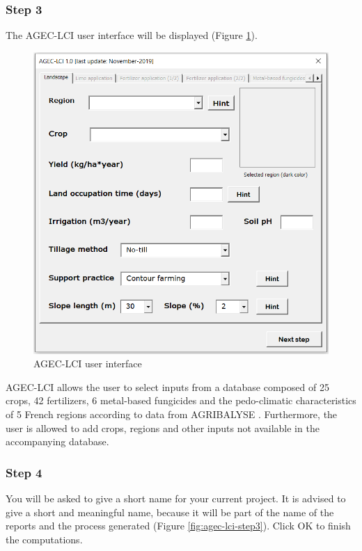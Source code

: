 \documentclass[openany]{book}
\begin{document}
\hypertarget{step-3}{%
\subsubsection*{Step 3}\label{step-3}}

The AGEC-LCI user interface will be displayed (Figure \ref{fig:agec-lci-step2}).

\begin{figure}[ht]

{\centering \includegraphics[width=0.65\linewidth]{Figures/agec_lci_step2} 

}

\caption{AGEC-LCI user interface}\label{fig:agec-lci-step2}
\end{figure}

AGEC-LCI allows the user to select inputs from a database composed of 25 crops, 42 fertilizers, 6 metal-based fungicides and the pedo-climatic characteristics of 5 French regions according to data from AGRIBALYSE \citep{Koch2015}. Furthermore, the user is allowed to add crops, regions and other inputs not available in the accompanying database.

\hypertarget{step-4}{%
\subsubsection*{Step 4}\label{step-4}}

You will be asked to give a short name for your current project. It is advised to give a short and meaningful name, because it will be part of the name of the reports and the process generated (Figure \ref{fig:agec-lci-step3}). Click OK to finish the computations.
\end{document}
